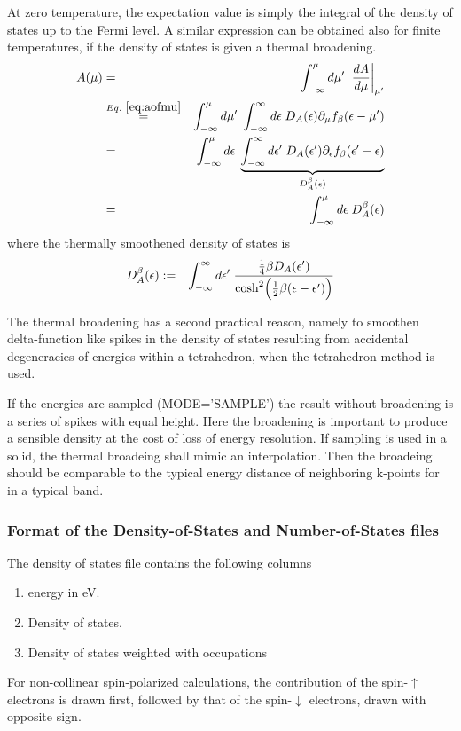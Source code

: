 \documentclass[final,12pt]{article}
\begin{document}
{{{{{{At zero  temperature, the expectation  value is simply the  integral of
the density of states up to  the Fermi level. A similar expression can
be obtained also for finite temperatures,  if the density of states is
given a thermal broadening.
\begin{eqnarray}
A(\mu)
&=&\int_{-\infty}^\mu d\mu'\;\left.\frac{dA}{d\mu}\right|_{\mu'}
\nonumber\\
&\stackrel{Eq.~\ref{eq:aofmu}}{=}&
\int_{-\infty}^\mu d\mu'\;
\int_{-\infty}^\infty d\epsilon\; D_A(\epsilon) \partial_\mu 
f_\beta(\epsilon-\mu')
\nonumber\\
&=&\int_{-\infty}^\mu d\epsilon\;
\underbrace{
\int_{-\infty}^\infty d\epsilon'\; D_A(\epsilon') \partial_\epsilon 
f_\beta(\epsilon'-\epsilon)}
_{D_A^{\beta}(\epsilon)}
\nonumber\\
&=&\int_{-\infty}^\mu d\epsilon\;D^\beta_A(\epsilon)
\end{eqnarray}
where the thermally smoothened density of states is
\begin{eqnarray}
D_A^{\beta}(\epsilon)
&:=&
\int_{-\infty}^\infty d\epsilon'\; 
\frac{\frac{1}{4}\beta D_A(\epsilon')}
{\cosh^2\Bigl(\frac{1}{2}\beta(\epsilon-\epsilon')\Bigr)}
\end{eqnarray}


The thermal broadening has a second practical reason, namely to
smoothen delta-function like spikes in the density of states resulting
from accidental degeneracies of energies within a tetrahedron, when
the tetrahedron method is used.

If the energies are sampled (MODE='SAMPLE') the result without
broadening is a series of spikes with equal height. Here the broadening
is important to produce a sensible density at the cost of loss of
energy resolution. If sampling is used in a solid, the thermal
broadeing shall mimic an interpolation. Then the broadeing should be
comparable to the typical energy distance of neighboring k-points for
in a typical band.

\subsubsection{Format of the Density-of-States and Number-of-States files}
\label{sec:formatdosfile}
The density of states file contains the following columns
\begin{enumerate}
\item energy in eV.
\item Density of states. 
\item Density of states weighted with occupations 
\end{enumerate}
For non-collinear spin-polarized calculations, the 
contribution of the spin-$\uparrow$ electrons is drawn first, followed
by that of the spin-$\downarrow$ electrons, drawn with opposite sign. 

}}}}}}
\end{document}

